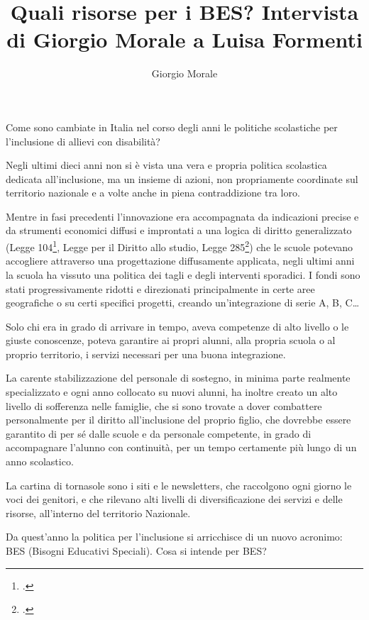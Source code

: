 \author{Giorgio Morale}
\title{Quali risorse per i BES?\xheadbreak
Intervista di Giorgio Morale a Luisa Formenti}
\label{cha:morale141013}
\maketitle
{}
Come sono cambiate in Italia nel corso degli anni le politiche scolastiche per l'inclusione di allievi con disabilità?

Negli ultimi dieci anni non si è vista una vera e propria politica scolastica dedicata all'inclusione, ma un insieme di azioni, non propriamente coordinate sul territorio nazionale e a volte anche in piena contraddizione tra loro.

Mentre in fasi precedenti l'innovazione era accompagnata da indicazioni precise e da strumenti economici diffusi e improntati a una logica di diritto generalizzato (Legge 104\footcite{Legge_104_92}, Legge per il Diritto allo studio, Legge 285\footcite{Legge_285_1997}) che le scuole potevano accogliere attraverso una progettazione diffusamente applicata, negli ultimi anni la scuola ha vissuto una politica dei tagli e degli interventi sporadici. I fondi sono stati progressivamente ridotti e direzionati principalmente in certe aree geografiche o su certi specifici progetti, creando un'integrazione di serie A, B, C…

Solo chi era in grado di arrivare in tempo, aveva competenze di alto livello o le giuste conoscenze, poteva garantire ai propri alunni, alla propria scuola o al proprio territorio, i servizi necessari per una buona integrazione.

La carente stabilizzazione del personale di sostegno, in minima parte realmente specializzato e ogni anno collocato su nuovi alunni, ha inoltre creato un alto livello di sofferenza nelle famiglie, che si sono trovate a dover combattere personalmente per il diritto all'inclusione del proprio figlio, che dovrebbe essere garantito di per sé dalle scuole e da personale competente, in grado di accompagnare l'alunno con continuità, per un tempo certamente più lungo di un anno scolastico.

La cartina di tornasole sono i siti e le newsletters, che raccolgono ogni giorno le voci dei genitori, e che rilevano alti livelli di diversificazione dei servizi e delle risorse, all'interno del territorio Nazionale.

Da quest'anno la politica per l'inclusione si arricchisce di un nuovo acronimo: BES (Bisogni Educativi Speciali). Cosa si intende per BES?

